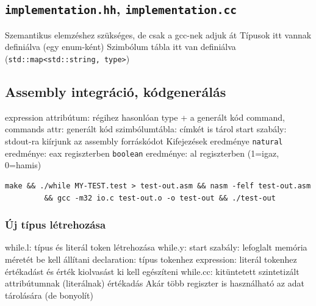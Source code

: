 \documentclass[12pt,a4paper]{article}
\begin{document}
\pagebreak

\subsection{\texttt{implementation.hh}, \texttt{implementation.cc}}

\begin{outline}
	\1 Szemantikus elemzéshez szükséges, de csak a gcc-nek adjuk át
	\1 Típusok itt vannak definiálva (egy enum-ként)
	\1 Szimbólum tábla itt van definiálva (\texttt{std::map<std::string, type>})
\end{outline}

\subsection{Assembly integráció, kódgenerálás}

\begin{outline}
	\1 expression attribútum: régihez hasonlóan type + a generált kód
	\1 command, commands attr: generált kód
	\1 szimbólumtábla: címkét is tárol
	\1 start szabály: stdout-ra kiírjunk az assembly forráskódot
	\1 Kifejezések eredménye
		\2 \texttt{natural} eredménye: eax regiszterben
		\2 \texttt{boolean} eredménye: al regiszterben (1=igaz, 0=hamis)
	\1 \begin{verbatim}make && ./while MY-TEST.test > test-out.asm && nasm -felf test-out.asm
	     && gcc -m32 io.c test-out.o -o test-out && ./test-out\end{verbatim}
\end{outline}

\subsubsection{Új típus létrehozása}

\begin{outline}
	\1 while.l: típus és literál token létrehozása
	\1 while.y:
		\2 start szabály: lefoglalt memória méretét be kell állítani
		\2 declaration: típus tokenhez
		\2 expression: literál tokenhez
		\2 értékadást és érték kiolvasást ki kell egészíteni
	\1 while.cc: kitüntetett szintetizált attribútumnak (literálnak) értékadás
	\1 Akár több regiszter is használható az adat tárolására (de bonyolít)
\end{outline}
\end{document}
